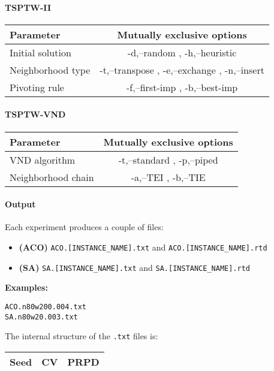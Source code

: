\documentclass{article}
\begin{document}
\paragraph{TSPTW-II}
\begin{tabular}{|l|c|}
\hline
\textbf{Parameter}	&	\textbf{Mutually exclusive options} \\ \hline
Initial solution & -d,--random , -h,--heuristic \\ \hline
Neighborhood type &-t,--transpose , -e,--exchange , -n,--insert \\ \hline 
Pivoting rule &	-f,--first-imp , -b,--best-imp \\ \hline
\end{tabular}

\paragraph{TSPTW-VND}

\begin{tabular}{|l|c|}
\hline
\textbf{Parameter}	&	\textbf{Mutually exclusive options} \\ \hline
VND algorithm & -t,--standard , -p,--piped \\ \hline
Neighborhood chain & 	-a,--TEI  , -b,--TIE \\ \hline
\end{tabular}

\paragraph{Output}
Each experiment produces a couple of files:
\begin{itemize}
  \item \textbf{(ACO)} \verb|ACO.[INSTANCE_NAME].txt| and \verb|ACO.[INSTANCE_NAME].rtd|
  \item \textbf{(SA)} \verb|SA.[INSTANCE_NAME].txt| and \verb|SA.[INSTANCE_NAME].rtd|
\end{itemize} 
				
					 
\textbf{Examples:} \begin{verbatim}
ACO.n80w200.004.txt
SA.n80w20.003.txt
\end{verbatim}


The internal structure of the \verb|.txt| files is: 
\begin{tabular}{|c|c|c|}
\hline
\textbf{Seed}	&	\textbf{CV} & \textbf{PRPD} \\ \hline
\end{tabular}
\end{document}
